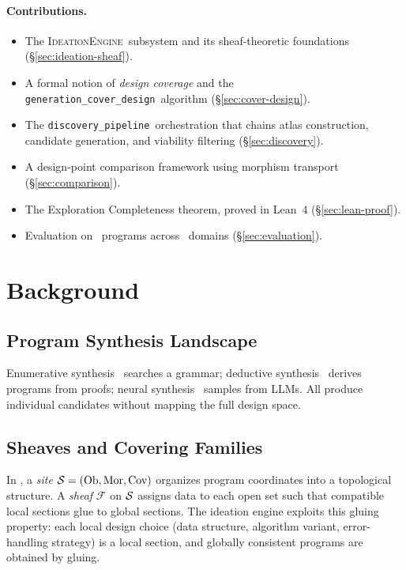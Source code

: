 \documentclass[11pt]{article}
\newcommand{\IdeationEngine}{\textsc{IdeationEngine}}
\newcommand{\DiscPipe}{\texttt{discovery\_pipeline}}
\newcommand{\GenCover}{\texttt{generation\_cover\_design}}
\begin{document}
\paragraph{Contributions.}
\begin{itemize}[noitemsep]
  \item The \IdeationEngine\ subsystem and its sheaf-theoretic
        foundations (§\ref{sec:ideation-sheaf}).
  \item A formal notion of \emph{design coverage} and the
        \GenCover\ algorithm (§\ref{sec:cover-design}).
  \item The \DiscPipe\ orchestration that chains atlas construction,
        candidate generation, and viability filtering
        (§\ref{sec:discovery}).
  \item A design-point comparison framework using morphism transport
        (§\ref{sec:comparison}).
  \item The Exploration Completeness theorem, proved in Lean~4
        (§\ref{sec:lean-proof}).
  \item Evaluation on \expTotalPrograms\ programs across
        \expDomainCount\ domains (§\ref{sec:evaluation}).
\end{itemize}

\section{Background}\label{sec:background}

\subsection{Program Synthesis Landscape}
Enumerative synthesis~\cite{Gulwani2017} searches a grammar;
deductive synthesis~\cite{MannaWaldinger1980} derives programs from
proofs; neural synthesis~\cite{CodeGen2022} samples from LLMs.
All produce individual candidates without mapping the full design space.

\subsection{Sheaves and Covering Families}
In \JuGeo, a \emph{site} $\mathcal{S} = (\mathrm{Ob}, \mathrm{Mor}, \mathrm{Cov})$ organizes
program coordinates into a topological structure.  A \emph{sheaf}
$\mathcal{F}$ on $\mathcal{S}$ assigns data to each open set such that
compatible local sections glue to global sections.  The ideation
engine exploits this gluing property: each local design choice
(data structure, algorithm variant, error-handling strategy) is a
local section, and globally consistent programs are obtained by
gluing.
\end{document}
